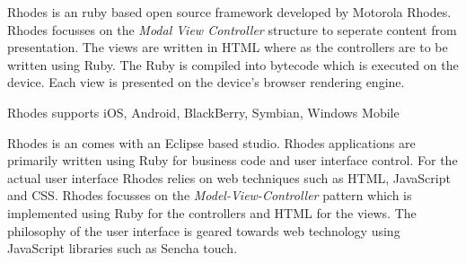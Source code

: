 \pagebreak

Rhodes is an ruby based open source framework developed by Motorola Rhodes. Rhodes focusses on the \emph{Modal View Controller} structure to seperate content from presentation. The views are written in HTML where as the controllers are to be written using Ruby. The Ruby is compiled into bytecode which is executed on the device. Each view is presented on the device’s browser rendering engine.

Rhodes supports iOS, Android, BlackBerry, Symbian, Windows Mobile

Rhodes is an comes with an Eclipse based studio. Rhodes applications are primarily written using Ruby for business code and user interface control. For the actual user interface Rhodes relies on web techniques such as HTML, JavaScript and CSS. 
Rhodes focusses on the \emph{Model-View-Controller} pattern which is implemented using Ruby for the controllers and HTML for the views. The philosophy of the user interface is geared towards web technology using JavaScript libraries such as Sencha touch.

